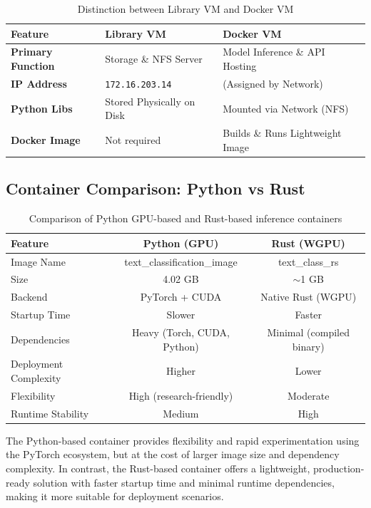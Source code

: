 \documentclass[10pt,a4paper,twocolumn]{article}
\begin{document}
\begin{table}[t!]
\centering
\begin{tabular}{|l|l|l|}
\hline
\textbf{Feature} & \textbf{Library VM} & \textbf{Docker VM} \\ \hline
\textbf{Primary Function} & Storage \& NFS Server & Model Inference \& API Hosting \\ \hline
\textbf{IP Address} & \texttt{172.16.203.14} & (Assigned by Network) \\ \hline
\textbf{Python Libs} & Stored Physically on Disk & Mounted via Network (NFS) \\ \hline
\textbf{Docker Image} & Not required & Builds \& Runs Lightweight Image \\ \hline
\end{tabular}
\caption{Distinction between Library VM and Docker VM}
\end{table}




\newpage

\subsection{Container Comparison: Python vs Rust}

\begin{table}[t!]
\centering
\begin{tabular}{|l|c|c|}
\hline
\textbf{Feature} & \textbf{Python (GPU)} & \textbf{Rust (WGPU)} \\
\hline
Image Name & text\_classification\_image & text\_class\_rs \\
\hline
Size & 4.02 GB & $\sim$1 GB \\
\hline
Backend & PyTorch + CUDA & Native Rust (WGPU) \\
\hline
Startup Time & Slower & Faster \\
\hline
Dependencies & Heavy (Torch, CUDA, Python) & Minimal (compiled binary) \\
\hline
Deployment Complexity & Higher & Lower \\
\hline
Flexibility & High (research-friendly) & Moderate \\
\hline
Runtime Stability & Medium & High \\
\hline
\end{tabular}
\caption{Comparison of Python GPU-based and Rust-based inference containers}
\end{table}

\noindent
The Python-based container provides flexibility and rapid experimentation using the PyTorch ecosystem, but at the cost of larger image size and dependency complexity. In contrast, the Rust-based container offers a lightweight, production-ready solution with faster startup time and minimal runtime dependencies, making it more suitable for deployment scenarios.
\end{document}
